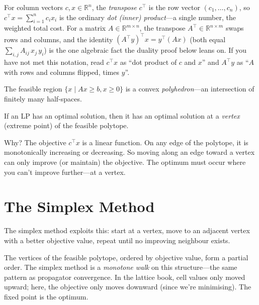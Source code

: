 \documentclass[11pt, a4paper, oneside]{book}
\newcommand{\R}{\mathbb{R}}
\begin{document}
\begin{intuitionbox}[title={Transpose and inner-product notation}]
For column vectors $c, x \in \R^n$, the \emph{transpose} $c^\top$ is the row
vector $(c_1,\dots,c_n)$, so $c^\top x = \sum_{i=1}^n c_i x_i$ is the ordinary
\emph{dot (inner) product}---a single number, the weighted total cost.  For a
matrix $A \in \R^{m\times n}$, the transpose $A^\top \in \R^{n\times m}$ swaps
rows and columns, and the identity $(A^\top y)^\top x = y^\top (A x)$ (both equal
$\sum_{i,j} A_{ij}\,x_j\,y_i$) is the one algebraic fact the duality proof below
leans on.  If you have not met this notation, read $c^\top x$ as ``dot product of
$c$ and $x$'' and $A^\top y$ as ``$A$ with rows and columns flipped, times $y$''.
\end{intuitionbox}

The feasible region $\{x \mid Ax \geq b, x \geq 0\}$ is a convex
\emph{polyhedron}---an intersection of finitely many half-spaces.

\begin{thmbox}[title={Fundamental Theorem of Linear Programming}]
If an LP has an optimal solution, then it has an optimal solution at a
\emph{vertex} (extreme point) of the feasible polytope.
\end{thmbox}

\begin{intuitionbox}
Why?  The objective $c^\top x$ is a linear function.  On any edge of the
polytope, it is monotonically increasing or decreasing.  So moving along
an edge toward a vertex can only improve (or maintain) the objective.
The optimum must occur where you can't improve further---at a vertex.
\end{intuitionbox}

\section{The Simplex Method}

The simplex method exploits this: start at a vertex, move to an adjacent
vertex with a better objective value, repeat until no improving neighbour
exists.

\begin{crossrefbox}
The vertices of the feasible polytope, ordered by objective value,
form a partial order.  The simplex method is a \emph{monotone walk}
on this structure---the same pattern as propagator convergence.  In the
lattice book, cell values only moved upward; here, the objective only
moves downward (since we're minimising).  The fixed point is the optimum.
\end{crossrefbox}
\end{document}
